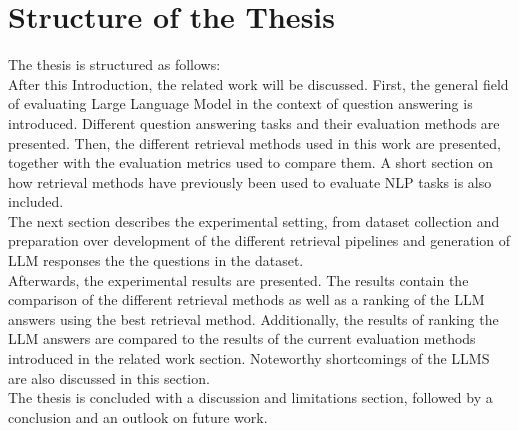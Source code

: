 

\section{Structure of the Thesis}\label{sec:structure-of-the-thesis}
The thesis is structured as follows:\\
After this Introduction, the related work will be discussed.
First, the general field of evaluating Large Language Model in the context of question answering is introduced.
Different question answering tasks and their evaluation methods are presented.
Then, the different retrieval methods used in this work are presented, together with the evaluation metrics used to compare them.
A short section on how retrieval methods have previously been used to evaluate NLP tasks is also included.
\\
The next section describes the experimental setting, from dataset collection and preparation over development of the different retrieval pipelines and generation of LLM responses the the questions in the dataset.
\\
Afterwards, the experimental results are presented. The results contain the comparison of the different retrieval methods as well as a ranking of the LLM answers using the best retrieval method.
Additionally, the results of ranking the LLM answers are compared to the results of the current evaluation methods introduced in the related work section.
Noteworthy shortcomings of the LLMS are also discussed in this section.
\\
The thesis is concluded with a discussion and limitations section, followed by a conclusion and an outlook on future work.